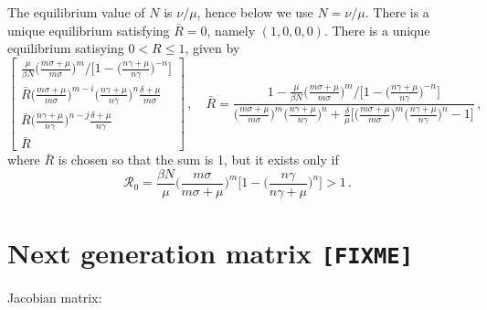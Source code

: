 \documentclass[fleqn]{article}
\begin{document}
The equilibrium value of $N$ is $\nu / \mu$, hence below we use
$N = \nu / \mu$.  There is a unique equilibrium satisfying
$\bar{R} = 0$, namely $(1, 0, 0, 0)$.  There is a unique equilibrium
satisying $0 < R \leq 1$, given by
\begin{equation}
\begin{bmatrix}
  \frac{\mu}{\beta N} \big(\frac{m \sigma + \mu}{m \sigma}\big)^{m} \big/ \big[1 - \big(\frac{n \gamma + \mu}{n \gamma}\big)^{-n}\big] \\
  \bar{R} \big(\frac{m \sigma + \mu}{m \sigma}\big)^{m - i} \big(\frac{n \gamma + \mu}{n \gamma}\big)^{n} \frac{\delta + \mu}{m \sigma} \\
  \bar{R} \big(\frac{n \gamma + \mu}{n \gamma}\big)^{n - j} \frac{\delta + \mu}{n \gamma} \\
  \bar{R}
\end{bmatrix}
\,,\quad
\bar{R} = \frac{1 - \frac{\mu}{\beta N} \big(\frac{m \sigma + \mu}{m \sigma}\big)^{m} \big/ \big[1 - \big(\frac{n \gamma + \mu}{n \gamma}\big)^{-n}\big]}{\big(\frac{m \sigma + \mu}{m \sigma}\big)^{m} \big(\frac{n \gamma + \mu}{n \gamma}\big)^{n} + \frac{\delta}{\mu} \big[\big(\frac{m \sigma + \mu}{m \sigma}\big)^{m} \big(\frac{n \gamma + \mu}{n \gamma}\big)^{n} - 1\big]}\,,
\end{equation}
where $\bar{R}$ is chosen so that the sum is 1, but it exists only if
\begin{equation}
\mathcal{R}_{0} = \frac{\beta N}{\mu} \Big(\frac{m \sigma}{m \sigma + \mu}\Big)^{m} \Big[1 - \Big(\frac{n \gamma}{n \gamma + \mu}\Big)^{n}\Big] > 1\,.
\end{equation}
\clearpage


\section{Next generation matrix \texttt{[FIXME]}}

Jacobian matrix:
\end{document}
